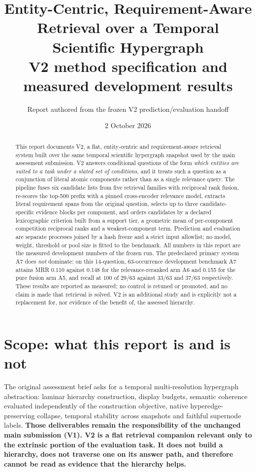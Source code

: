 \documentclass[11pt,a4paper]{article}
\title{Entity-Centric, Requirement-Aware Retrieval over a Temporal Scientific Hypergraph\\[2mm]
\large V2 method specification and measured development results}
\author{Report authored from the frozen V2 prediction/evaluation handoff}
\date{2 October 2026}
\begin{document}
\maketitle

\begin{abstract}
\noindent This report documents V2, a flat, entity-centric and requirement-aware retrieval system built over the same temporal scientific hypergraph snapshot used by the main assessment submission. V2 answers conditional questions of the form \emph{which entities are suited to a task under a stated set of conditions}, and it treats such a question as a conjunction of literal atomic components rather than as a single relevance query. The pipeline fuses six candidate lists from five retrieval families with reciprocal rank fusion, re-scores the top-500 prefix with a pinned cross-encoder relevance model, extracts literal requirement spans from the original question, selects up to three candidate-specific evidence blocks per component, and orders candidates by a declared lexicographic criterion built from a support tier, a geometric mean of per-component competition reciprocal ranks and a weakest-component term. Prediction and evaluation are separate processes joined by a hash freeze and a strict input allowlist; no model, weight, threshold or pool size is fitted to the benchmark. All numbers in this report are the measured development numbers of the frozen run. The predeclared primary system A7 does \emph{not} dominate: on this 14-question, 63-occurrence development benchmark A7 attains MRR 0.110 against 0.148 for the relevance-reranked arm A6 and 0.155 for the pure fusion arm A5, and recall at 100 of 29/63 against 33/63 and 37/63 respectively. These results are reported as measured; no control is retuned or promoted, and no claim is made that retrieval is solved. V2 is an additional study and is explicitly not a replacement for, nor evidence of the benefit of, the assessed hierarchy.
\end{abstract}

\section{Scope: what this report is and is not}
\label{sec:scope}

The original assessment brief asks for a temporal multi-resolution hypergraph abstraction: laminar hierarchy construction, display budgets, semantic coherence evaluated independently of the construction objective, native hyperedge-preserving collapse, temporal stability across snapshots and faithful supernode labels. \textbf{Those deliverables remain the responsibility of the unchanged main submission (V1). V2 is a flat retrieval companion relevant only to the extrinsic portion of the evaluation task. It does not build a hierarchy, does not traverse one on its answer path, and therefore cannot be read as evidence that the hierarchy helps.}
\end{document}
